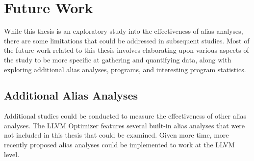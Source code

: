 \chapter{Future Work}

While this thesis is an exploratory study into the effectiveness of alias analyses, there are some limitations that could be addressed in subsequent studies. Most of the future work related to this thesis involves elaborating upon various aspects of the study to be more specific at gathering and quantifying data, along with exploring additional alias analyses, programs, and interesting program statistics.

\section{Additional Alias Analyses}
Additional studies could be conducted to measure the effectiveness of other alias analyses. The LLVM Optimizer features several built-in alias analyses that were not included in this thesis that could be examined. Given more time, more recently proposed alias analyses could be implemented to work at the LLVM level.
